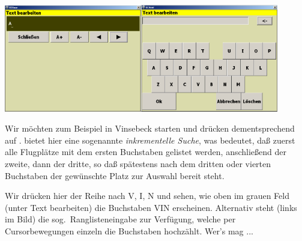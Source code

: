 \begin{center}
\blink~\blink~\blink~\blink~\\

 \includegraphics[width=6cm]{Bilder/Texteingabe2.png}\qquad \includegraphics[width=6cm]{Bilder/Texteingabe1.png}
\end{center}

Wir möchten zum Beispiel in \textsf{Vinsebeck} starten und drücken dementsprechend auf .
\xc bietet hier eine sogenannte\textsl{ inkrementelle Suche}, was bedeutet, daß zuerst alle Flugplätze mit
dem ersten Buchstaben gelistet werden, anschließend der zweite, dann der dritte, so daß spätestens nach
dem dritten oder vierten Buchstaben der gewünschte Platz zur Auswahl bereit steht.

Wir drücken hier der Reihe nach \textsf{V, I, N} und sehen, wie oben im grauen Feld  (unter \textsf{Text bearbeiten})
die Buchstaben \textsf{VIN} erscheinen.  Alternativ steht (links im Bild) die
sog.\ Ranglisteneingabe zur Verfügung, welche per Cursorbewegungen einzeln die Buchstaben hochzählt. Wer's mag ...

 